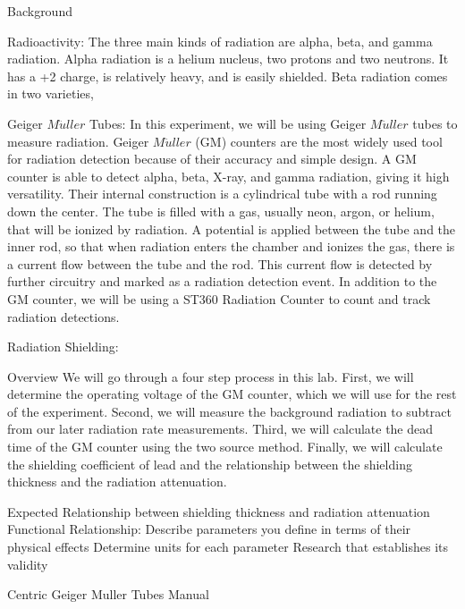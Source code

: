 Background

Radioactivity: 
	The three main kinds of radiation are alpha, beta, and gamma radiation. Alpha radiation is a helium nucleus, two protons and two neutrons. It has a +2 charge, is relatively heavy, and is easily shielded. Beta radiation comes in two varieties, 

Geiger $M\ddot{u}ller$ Tubes:
	In this experiment, we will be using Geiger $M\ddot{u}ller$ tubes to measure radiation. Geiger $M\ddot{u}ller$ (GM) counters are the most widely used tool for radiation detection because of their accuracy and simple design. A GM counter is able to detect alpha, beta, X-ray, and gamma radiation, giving it high versatility. Their internal construction is a cylindrical tube with a rod running down the center. The tube is filled with a gas, usually neon, argon, or helium, that will be ionized by radiation. A potential is applied between the tube and the inner rod, so that when radiation enters the chamber and ionizes the gas, there is a current flow between the tube and the rod. This current flow is detected by further circuitry and marked as a radiation detection event.\cite{Centric} In addition to the GM counter, we will be using a ST360 Radiation Counter to count and track radiation detections.


Radiation Shielding:

Overview
	We will go through a four step process in this lab. First, we will determine the operating voltage of the GM counter, which we will use for the rest of the experiment. Second, we will measure the background radiation to subtract from our later radiation rate measurements. Third, we will calculate the dead time of the GM counter using the two source method. Finally, we will calculate the shielding coefficient of lead and the relationship between the shielding thickness and the radiation attenuation. 

Expected Relationship between shielding thickness and radiation attenuation
Functional Relationship:
Describe parameters you define in terms of their physical effects
Determine units for each parameter
Research that establishes its validity

Centric Geiger Muller Tubes Manual